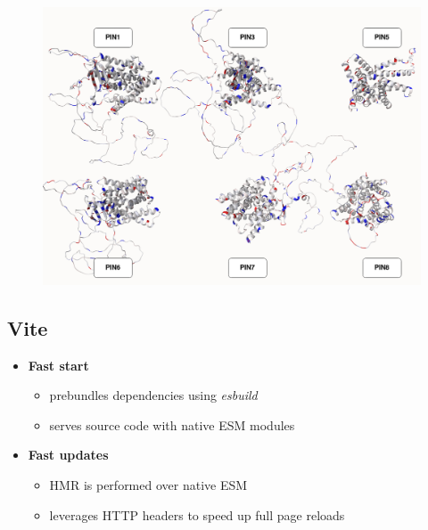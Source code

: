\documentclass[
]{beamer}
\begin{document}
\begin{frame}
  \begin{figure}
    \includegraphics[width=1\textwidth,height=\textheight,keepaspectratio]{images/pins2.png}
  \end{figure}
\end{frame}

\subsection[Vite]{Vite}

\begin{frame}{}
  \begin{itemize}
    \item \textbf{Fast start}
    \begin{itemize}
        \item prebundles dependencies using \textit{esbuild}
        \item serves source code with native ESM modules
    \end{itemize}
    \item \textbf{Fast updates}
    \begin{itemize}
        \item HMR is performed over native ESM
        \item leverages HTTP headers to speed up full page reloads
    \end{itemize}
\end{itemize}
\end{frame}
\end{document}
